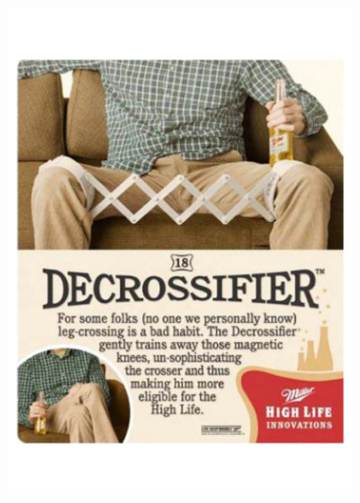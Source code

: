 \documentclass[hidelinks,11pt,a4paper]{report}
\begin{document}
\begin{figure}
\begin{subfigure}[b]{0.3\textwidth}
     \end{subfigure}
     \begin{subfigure}[b]{0.3\textwidth}
         \centering
         \includegraphics[width=\textwidth,scale=0.5]{images/humans_concreteness_img2.pdf}
         \caption{}
         

\end{subfigure}
\end{figure}
\end{document}
